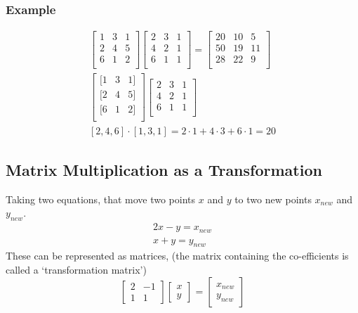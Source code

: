 \documentclass[12pt] {article}
\begin{document}
\subsubsection*{Example}
\begin{gather*}
  \begin{bmatrix}
    1 & 3 & 1 \\
    2 & 4 & 5 \\
    6 & 1 & 2 \\
  \end{bmatrix}
  \begin{bmatrix}
    2 & 3 & 1 \\
    4 & 2 & 1 \\
    6 & 1 & 1 \\
  \end{bmatrix}
  =
  \begin{bmatrix}
    20 & 10 & 5 \\
    50 & 19 & 11 \\
    28 & 22 & 9 \\
  \end{bmatrix}
  \\
  \begin{bmatrix}
    [1 & 3 & 1] \\
    [2 & 4 & 5] \\
    [6 & 1 & 2] \\
  \end{bmatrix}
  \begin{bmatrix}
    2 & 3 & 1 \\
    4 & 2 & 1 \\
    6 & 1 & 1 \\
  \end{bmatrix} 
  \\
  [2, 4, 6]\cdot [1, 3, 1] = 2\cdot1 + 4\cdot3 + 6\cdot1 = 20
\end{gather*}

\subsection*{Matrix Multiplication as a Transformation}
Taking two equations, that move two points $x$ and $y$ to two new points $x_{new}$ and $y_{new}$. 
\begin{align*}
  2x - y = x_{new} \\
  x + y = y_{new}
\end{align*}
These can be represented as matrices, (the matrix containing the co-efficients
is called a `transformation matrix')
\begin{equation*}
  \begin{bmatrix}
    2 & -1 \\
    1 & 1 
  \end{bmatrix}
  \begin{bmatrix}
    x \\
    y 
  \end{bmatrix}
  =
  \begin{bmatrix}
    x_{new} \\
    y_{new}
  \end{bmatrix}
\end{equation*}
\end{document}
